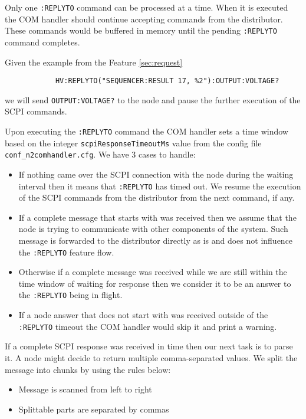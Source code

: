 \begin{itemize}
	\item Only one \texttt{:REPLYTO} command can be processed at a time. When it is executed the COM handler should continue accepting commands from the distributor. These commands would be buffered in memory until the pending \texttt{:REPLYTO} command completes.
	\item{
		Given the example from the Feature \ref{sec:request}
		\begin{verbatim}
			HV:REPLYTO("SEQUENCER:RESULT 17, %2"):OUTPUT:VOLTAGE?
		\end{verbatim}
		we will send \texttt{OUTPUT:VOLTAGE?} to the node and pause the further execution of the SCPI commands.
	}
	\item{
		Upon executing the \texttt{:REPLYTO} command the COM handler sets a time window based on the integer \texttt{scpiResponseTimeoutMs} value from the config file \texttt{conf\_n2comhandler.cfg}. We have 3 cases to handle:
		\begin{itemize}
			\item If nothing came over the SCPI connection with the node during the waiting interval then it means that \texttt{:REPLYTO} has timed out. We resume the execution of the SCPI commands from the distributor from the next command, if any.
			\item If a complete message that starts with \highlight{:} was received then we assume that the node is trying to communicate with other components of the system. Such message is forwarded to the distributor directly as is and does not influence the \texttt{:REPLYTO} feature flow.
			\item Otherwise if a complete message was received while we are still within the time window of waiting for response then we consider it to be an answer to the \texttt{:REPLYTO} being in flight.
			\item If a node answer that does not start with \highlight{:} was received outside of the \texttt{:REPLYTO} timeout the COM handler would skip it and print a warning.
		\end{itemize}
		\item{
			If a complete SCPI response was received in time then our next task is to parse it. A node might decide to return multiple comma-separated values. We split the message into chunks by using the rules below:
			\begin{itemize}
				\item Message is scanned from left to right
				\item Splittable parts are separated by commas \highlight{,}

\end{itemize}}}
\end{itemize}
